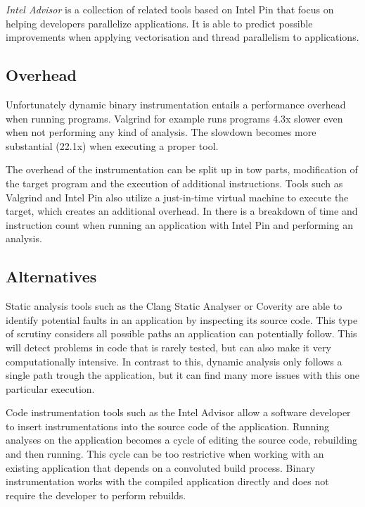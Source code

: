 \emph{Intel Advisor} \cite{inteladvisor} is a collection of related tools based on Intel Pin that focus on helping developers parallelize applications. It is able to predict possible improvements when applying vectorisation and thread parallelism to applications.

\subsection{Overhead}

Unfortunately dynamic binary instrumentation entails a performance overhead when running programs. Valgrind for example runs programs 4.3x slower \cite{valgrind} even when not performing any kind of analysis. The slowdown becomes more substantial (22.1x) when executing a proper tool.

The overhead of the instrumentation can be split up in tow parts, modification of the target program and the execution of additional instructions. Tools such as Valgrind and Intel Pin also utilize a just-in-time virtual machine to execute the target, which creates an additional overhead. In \cite{instoverhead} there is a breakdown of time and instruction count when running an application with Intel Pin and performing an analysis.

\subsection{Alternatives}

Static analysis tools such as the Clang Static Analyser \cite{clang} or Coverity \cite{coverity} are able to identify potential faults in an application by inspecting its source code. This type of scrutiny considers all possible paths an application can potentially follow. This will detect problems in code that is rarely tested, but can also make it very computationally intensive. In contrast to this, dynamic analysis only follows a single path trough the application, but it can find many more issues with this one particular execution.

Code instrumentation tools such as the Intel Advisor \cite{inteladvisor} allow a software developer to insert instrumentations into the source code of the application. Running analyses on the application becomes a cycle of editing the source code, rebuilding and then running. This cycle can be too restrictive when working with an existing application that depends on a convoluted build process. Binary instrumentation works with the compiled application directly and does not require the developer to perform rebuilds.

